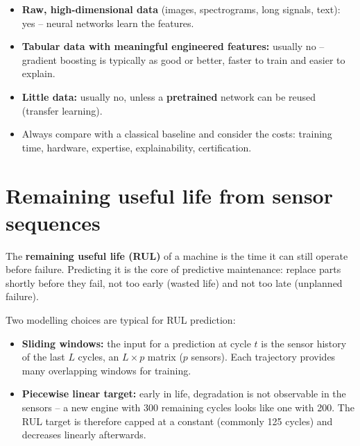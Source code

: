 \documentclass[
  letterpaper,
  DIV=11,
  numbers=noendperiod]{scrreprt}
\providecommand{\tightlist}{%
  \setlength{\itemsep}{0pt}\setlength{\parskip}{0pt}}\usepackage{longtable,booktabs,array}
\begin{document}
\begin{tcolorbox}[enhanced jigsaw, left=2mm, title=\textcolor{quarto-callout-tip-color}{\faLightbulb}\hspace{0.5em}{Engineering practice: when is deep learning worth it?}, opacityback=0, breakable, rightrule=.15mm, arc=.35mm, toptitle=1mm, colbacktitle=quarto-callout-tip-color!10!white, opacitybacktitle=0.6, coltitle=black, colframe=quarto-callout-tip-color-frame, bottomrule=.15mm, leftrule=.75mm, bottomtitle=1mm, titlerule=0mm, toprule=.15mm, colback=white]

\begin{itemize}
\tightlist
\item
  \textbf{Raw, high-dimensional data} (images, spectrograms, long
  signals, text): yes -- neural networks learn the features.
\item
  \textbf{Tabular data with meaningful engineered features:} usually no
  -- gradient boosting is typically as good or better, faster to train
  and easier to explain.
\item
  \textbf{Little data:} usually no, unless a \textbf{pretrained} network
  can be reused (transfer learning).
\item
  Always compare with a classical baseline and consider the costs:
  training time, hardware, expertise, explainability, certification.
\end{itemize}

\end{tcolorbox}

\section{Remaining useful life from sensor
sequences}\label{remaining-useful-life-from-sensor-sequences}

The \textbf{remaining useful life (RUL)} of a machine is the time it can
still operate before failure. Predicting it is the core of predictive
maintenance: replace parts shortly before they fail, not too early
(wasted life) and not too late (unplanned failure).

Two modelling choices are typical for RUL prediction:

\begin{itemize}
\tightlist
\item
  \textbf{Sliding windows:} the input for a prediction at cycle \(t\) is
  the sensor history of the last \(L\) cycles, an \(L \times p\) matrix
  (\(p\) sensors). Each trajectory provides many overlapping windows for
  training.
\item
  \textbf{Piecewise linear target:} early in life, degradation is not
  observable in the sensors -- a new engine with 300 remaining cycles
  looks like one with 200. The RUL target is therefore capped at a
  constant (commonly 125 cycles) and decreases linearly afterwards.
\end{itemize}
\end{document}
